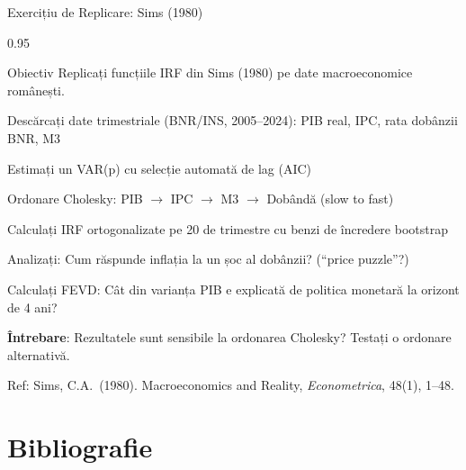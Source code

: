 \documentclass[9pt, aspectratio=169, t]{beamer}
\begin{document}
\begin{frame}{Exercițiu de Replicare: Sims (1980)}
    \begin{cminipage}{0.95\textwidth}
        \begin{block}{Obiectiv}
            Replicați funcțiile IRF din Sims (1980) pe date macroeconomice românești.
        \end{block}
        \begin{enumerate}\setlength{\itemsep}{2pt}
            {\small
            \item Descărcați date trimestriale (BNR/INS, 2005--2024): PIB real, IPC, rata dobânzii BNR, M3
            \item Estimați un VAR(p) cu selecție automată de lag (AIC)
            \item Ordonare Cholesky: PIB $\to$ IPC $\to$ M3 $\to$ Dobândă (slow to fast)
            \item Calculați IRF ortogonalizate pe 20 de trimestre cu benzi de încredere bootstrap
            \item Analizați: Cum răspunde inflația la un șoc al dobânzii? (``price puzzle''?)
            \item Calculați FEVD: Cât din varianța PIB e explicată de politica monetară la orizont de 4 ani?
            \item \textbf{Întrebare}: Rezultatele sunt sensibile la ordonarea Cholesky? Testați o ordonare alternativă.
            }
        \end{enumerate}
        {\tiny Ref: Sims, C.A.\ (1980). Macroeconomics and Reality, \textit{Econometrica}, 48(1), 1--48.}
    \end{cminipage}
\end{frame}
\section{Bibliografie}
\end{document}

